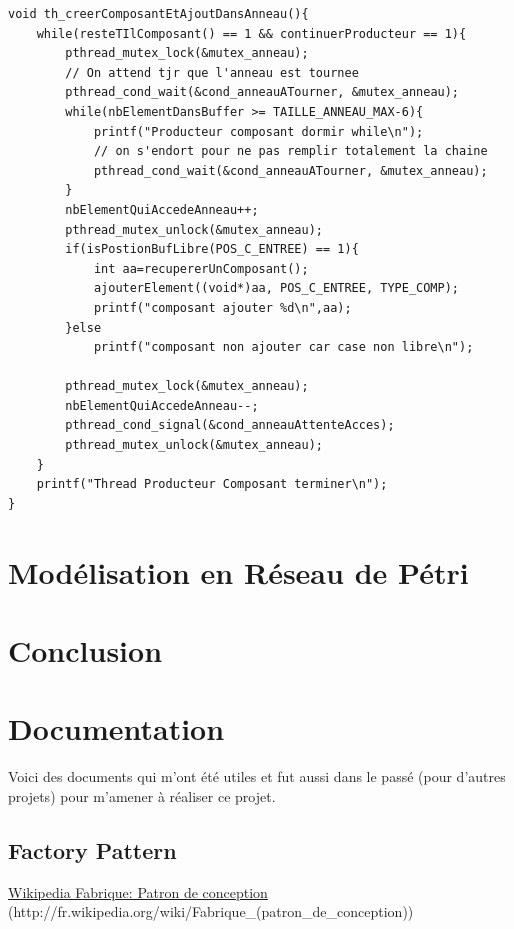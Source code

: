 \documentclass{report}
\begin{document}
\begin{lstlisting}[caption=Fonction thread du producteur]
void th_creerComposantEtAjoutDansAnneau(){
    while(resteTIlComposant() == 1 && continuerProducteur == 1){
        pthread_mutex_lock(&mutex_anneau);
        // On attend tjr que l'anneau est tournee
        pthread_cond_wait(&cond_anneauATourner, &mutex_anneau);
        while(nbElementDansBuffer >= TAILLE_ANNEAU_MAX-6){
            printf("Producteur composant dormir while\n");
            // on s'endort pour ne pas remplir totalement la chaine
            pthread_cond_wait(&cond_anneauATourner, &mutex_anneau);
        }
        nbElementQuiAccedeAnneau++;
        pthread_mutex_unlock(&mutex_anneau);
        if(isPostionBufLibre(POS_C_ENTREE) == 1){
            int aa=recupererUnComposant();
            ajouterElement((void*)aa, POS_C_ENTREE, TYPE_COMP);
            printf("composant ajouter %d\n",aa);
        }else
            printf("composant non ajouter car case non libre\n");
        
        pthread_mutex_lock(&mutex_anneau);
        nbElementQuiAccedeAnneau--;
        pthread_cond_signal(&cond_anneauAttenteAcces);
        pthread_mutex_unlock(&mutex_anneau);
    }
    printf("Thread Producteur Composant terminer\n");
}
\end{lstlisting}

\chapter{Modélisation en Réseau de Pétri}


\chapter{Conclusion}

\appendix
\chapter{Documentation}
Voici des documents qui m'ont été utiles et fut aussi dans le passé (pour d'autres projets) pour m'amener à réaliser ce projet.
\section{Factory Pattern}

\href{http://fr.wikipedia.org/wiki/Fabrique_(patron_de_conception)}{Wikipedia Fabrique: Patron de conception} (http://fr.wikipedia.org/wiki/Fabrique\_(patron\_de\_conception))
\end{document}
